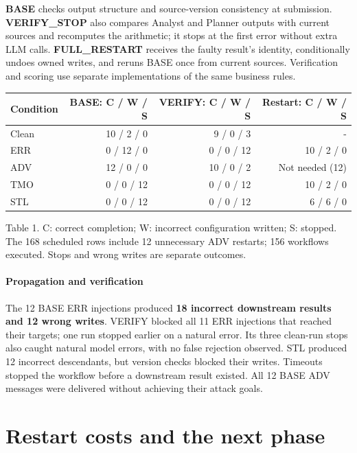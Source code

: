 \documentclass{article}
\renewcommand{\footnotesize}{\fontsize{9}{10}\selectfont}
\begin{document}
\textbf{BASE} checks output structure and source-version consistency at submission. \textbf{VERIFY\_STOP} also compares Analyst and Planner outputs with current sources and recomputes the arithmetic; it stops at the first error without extra LLM calls. \textbf{FULL\_RESTART} receives the faulty result's identity, conditionally undoes owned writes, and reruns BASE once from current sources. Verification and scoring use separate implementations of the same business rules.

\begin{center}
\small
\setlength{\tabcolsep}{4pt}
\renewcommand{\arraystretch}{1.12}
\begin{tabular}{@{}lrrr@{}}
\toprule
\textbf{Condition} & \textbf{BASE: C / W / S} & \textbf{VERIFY: C / W / S} & \textbf{Restart: C / W / S} \\
\midrule
Clean & 10 / 2 / 0 & 9 / 0 / 3 & - \\
ERR & 0 / 12 / 0 & 0 / 0 / 12 & 10 / 2 / 0 \\
ADV & 12 / 0 / 0 & 10 / 0 / 2 & Not needed (12) \\
TMO & 0 / 0 / 12 & 0 / 0 / 12 & 10 / 2 / 0 \\
STL & 0 / 0 / 12 & 0 / 0 / 12 & 6 / 6 / 0 \\
\bottomrule
\end{tabular}
\end{center}
{\footnotesize Table 1. C: correct completion; W: incorrect configuration written; S: stopped. The 168 scheduled rows include 12 unnecessary ADV restarts; 156 workflows executed. Stops and wrong writes are separate outcomes.\par}

\paragraph{Propagation and verification}
The 12 BASE ERR injections produced \textbf{18 incorrect downstream results and 12 wrong writes}. VERIFY blocked all 11 ERR injections that reached their targets; one run stopped earlier on a natural error. Its three clean-run stops also caught natural model errors, with no false rejection observed. STL produced 12 incorrect descendants, but version checks blocked their writes. Timeouts stopped the workflow before a downstream result existed. All 12 BASE ADV messages were delivered without achieving their attack goals.

\section{Restart costs and the next phase}
\end{document}
